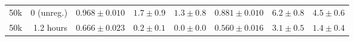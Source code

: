 \begin{table}[ht]
{\begin{tabular}{rr|rrr|rrr}
50k & 0 (unreg.) & \cellcolor{green!49} $0.968 \pm 0.010$ & \cellcolor{red!7} $1.7 \pm 0.9$ & \cellcolor{red!7} $1.3 \pm 0.8$ & \cellcolor{green!42} $\bm{0.881 \pm 0.010}$ & \cellcolor{red!14} $6.2 \pm 0.8$ & \cellcolor{red!12} $4.5 \pm 0.6$ \\
50k & 1.2 hours & \cellcolor{green!24} $0.666 \pm 0.023$ & \cellcolor{red!5} $\bm{0.2 \pm 0.1}$ & \cellcolor{red!5} $\bm{0.0 \pm 0.0}$ & \cellcolor{green!16} $0.560 \pm 0.016$ & \cellcolor{red!10} $\bm{3.1 \pm 0.5}$ & \cellcolor{red!7} $\bm{1.4 \pm 0.4}$ \\
\bottomrule
\end{tabular}}
\end{table}
